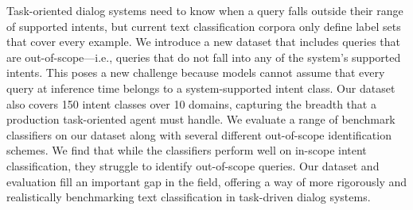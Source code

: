 Task-oriented dialog systems need to know when a query falls outside their range of supported intents, but current text classification corpora only define label sets that cover every example. We introduce a new dataset that includes queries that are out-of-scope---i.e., queries that do not fall into any of the system's supported intents. This poses a new challenge because models cannot assume that every query at inference time belongs to a system-supported intent class. Our dataset also covers 150 intent classes over 10 domains, capturing the breadth that a production task-oriented agent must handle. We evaluate a range of benchmark classifiers on our dataset along with several different out-of-scope identification schemes. We find that while the classifiers perform well on in-scope intent classification, they struggle to identify out-of-scope queries. Our dataset and evaluation fill an important gap in the field, offering a way of more rigorously and realistically benchmarking text classification in task-driven dialog systems.